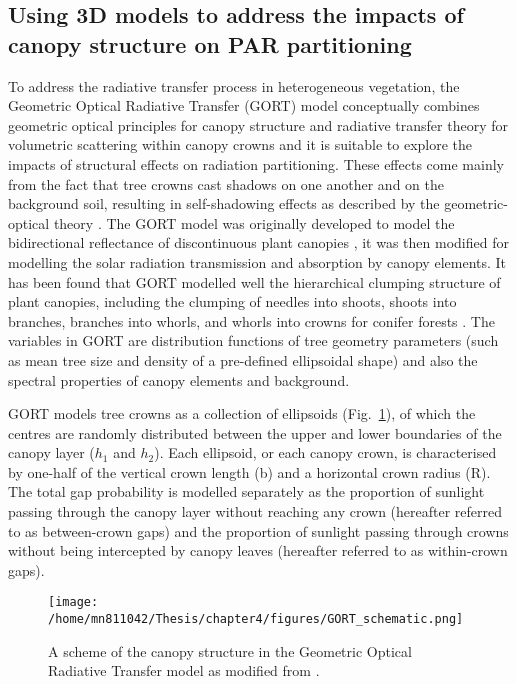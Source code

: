 \subsection{Using 3D models to address the impacts of canopy structure on PAR partitioning}
To address the radiative transfer process in heterogeneous vegetation, the Geometric Optical Radiative Transfer (GORT) model conceptually combines geometric optical principles for canopy structure and radiative transfer theory for volumetric scattering within canopy crowns \citep{Li1995} and it is suitable to explore the impacts of structural effects on radiation partitioning. These effects come mainly from the fact that tree crowns cast shadows on one another and on the background soil, resulting in self-shadowing effects as described by the geometric-optical theory \citep{Li1992}. The GORT model was originally developed to model the bidirectional reflectance of discontinuous plant canopies \citep{Li1995}, it was then modified for modelling the solar radiation transmission and absorption by canopy elements. It has been found that GORT modelled well the hierarchical clumping structure of plant canopies, including the clumping of needles into shoots, shoots into branches, branches into whorls, and whorls into crowns for conifer forests \citep{Ni1997}. The variables in GORT are distribution functions of tree geometry parameters (such as mean tree size and density of a pre-defined ellipsoidal shape) and also the spectral properties of canopy elements and background. 

GORT models tree crowns as a collection of ellipsoids (Fig.~\ref{fig:gort_scheme}), of which the centres are randomly distributed between the upper and lower boundaries of the canopy  layer  ($h_1$ and $h_2$). Each ellipsoid, or each canopy crown, is characterised by one-half of the vertical crown length (b) and a horizontal crown radius (R). The total gap probability is modelled separately as the proportion of sunlight passing through the canopy layer without reaching any crown (hereafter referred to as between-crown gaps) and the proportion of sunlight passing through crowns without being intercepted by canopy leaves (hereafter referred to as within-crown gaps). 

\begin{figure}[ht]
      	\centering
        \texttt{[image: /home/mn811042/Thesis/chapter4/figures/GORT\_schematic.png]}
        \caption{A scheme of the canopy structure in the Geometric Optical Radiative Transfer model as modified from \citet{Ni1998}.} 
\label{fig:gort_scheme}
\end{figure}

